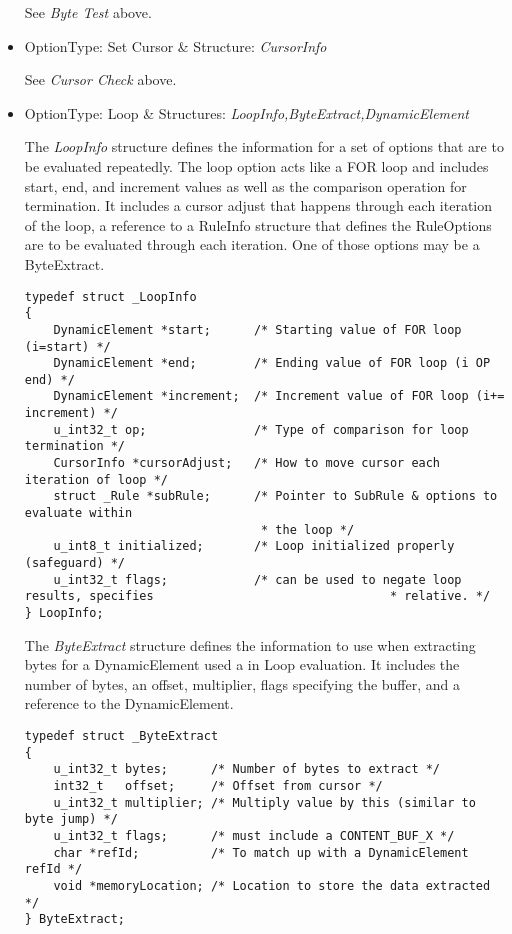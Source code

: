 \documentclass[english]{report}
\begin{document}
\begin{itemize}
See {\em Byte Test} above.

\item {OptionType: Set Cursor \& Structure: {\em CursorInfo}}

See {\em Cursor Check} above.

\item {OptionType: Loop \& Structures: {\em LoopInfo,ByteExtract,DynamicElement}}

The {\em LoopInfo} structure defines the information for a set of options that
are to be evaluated repeatedly.  The loop option acts like a FOR loop and
includes start, end, and increment values as well as the comparison operation
for termination.  It includes a cursor adjust that happens through each
iteration of the loop, a reference to a RuleInfo structure that defines the
RuleOptions are to be evaluated through each iteration.  One of those options
may be a ByteExtract.

\begin{verbatim}
typedef struct _LoopInfo
{
    DynamicElement *start;      /* Starting value of FOR loop (i=start) */
    DynamicElement *end;        /* Ending value of FOR loop (i OP end) */
    DynamicElement *increment;  /* Increment value of FOR loop (i+= increment) */
    u_int32_t op;               /* Type of comparison for loop termination */
    CursorInfo *cursorAdjust;   /* How to move cursor each iteration of loop */
    struct _Rule *subRule;      /* Pointer to SubRule & options to evaluate within
                                 * the loop */
    u_int8_t initialized;       /* Loop initialized properly (safeguard) */
    u_int32_t flags;            /* can be used to negate loop results, specifies                                 * relative. */
} LoopInfo;
\end{verbatim}

The {\em ByteExtract} structure defines the information to use when extracting
bytes for a DynamicElement used a in Loop evaluation.  It includes the number of
bytes, an offset, multiplier, flags specifying the buffer, and a reference to
the DynamicElement.

\begin{verbatim}
typedef struct _ByteExtract
{
    u_int32_t bytes;      /* Number of bytes to extract */
    int32_t   offset;     /* Offset from cursor */
    u_int32_t multiplier; /* Multiply value by this (similar to byte jump) */
    u_int32_t flags;      /* must include a CONTENT_BUF_X */
    char *refId;          /* To match up with a DynamicElement refId */
    void *memoryLocation; /* Location to store the data extracted */
} ByteExtract;
\end{verbatim}


\end{itemize}
\end{document}

